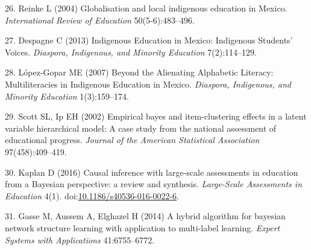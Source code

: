 \documentclass[9pt,twocolumn,twoside,]{pnas-new}
\begin{document}
\leavevmode\hypertarget{ref-Reinke2004}{}%
26. Reinke L (2004) Globalisation and local indigenous education in
Mexico. \emph{International Review of Education} 50(5-6):483--496.

\leavevmode\hypertarget{ref-Despagne2013}{}%
27. Despagne C (2013) Indigenous Education in Mexico: Indigenous
Students' Voices. \emph{Diaspora, Indigenous, and Minority Education}
7(2):114--129.

\leavevmode\hypertarget{ref-Lopez-Gopar2007}{}%
28. López-Gopar ME (2007) Beyond the Alienating Alphabetic Literacy:
Multiliteracies in Indigenous Education in Mexico. \emph{Diaspora,
Indigenous, and Minority Education} 1(3):159--174.

\leavevmode\hypertarget{ref-Scott2002}{}%
29. Scott SL, Ip EH (2002) Empirical bayes and item-clustering effects
in a latent variable hierarchical model: A case study from the national
assessment of educational progress. \emph{Journal of the American
Statistical Association} 97(458):409--419.

\leavevmode\hypertarget{ref-Kaplan2016}{}%
30. Kaplan D (2016) Causal inference with large-scale assessments in
education from a Bayesian perspective: a review and synthesis.
\emph{Large-Scale Assessments in Education} 4(1).
doi:\href{https://doi.org/10.1186/s40536-016-0022-6}{10.1186/s40536-016-0022-6}.

\leavevmode\hypertarget{ref-h2pc}{}%
31. Gasse M, Aussem A, Elghazel H (2014) A hybrid algorithm for bayesian
network structure learning with application to multi-label learning.
\emph{Expert Systems with Applications} 41:6755--6772.



% 
\end{document}
